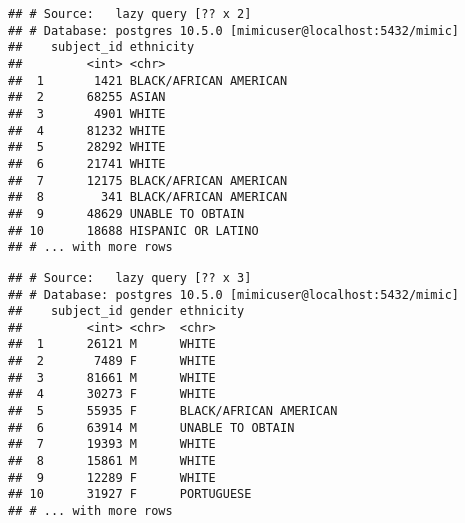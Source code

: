 \documentclass[]{article}
\newenvironment{Shaded}{\begin{snugshade}}{\end{snugshade}}
\newcommand{\KeywordTok}[1]{\textcolor[rgb]{0.13,0.29,0.53}{\textbf{#1}}}
\newcommand{\DataTypeTok}[1]{\textcolor[rgb]{0.13,0.29,0.53}{#1}}
\newcommand{\StringTok}[1]{\textcolor[rgb]{0.31,0.60,0.02}{#1}}
\newcommand{\OperatorTok}[1]{\textcolor[rgb]{0.81,0.36,0.00}{\textbf{#1}}}
\newcommand{\NormalTok}[1]{#1}
\begin{document}
\begin{Shaded}
\end{Shaded}

\begin{verbatim}
## # Source:   lazy query [?? x 2]
## # Database: postgres 10.5.0 [mimicuser@localhost:5432/mimic]
##    subject_id ethnicity             
##         <int> <chr>                 
##  1       1421 BLACK/AFRICAN AMERICAN
##  2      68255 ASIAN                 
##  3       4901 WHITE                 
##  4      81232 WHITE                 
##  5      28292 WHITE                 
##  6      21741 WHITE                 
##  7      12175 BLACK/AFRICAN AMERICAN
##  8        341 BLACK/AFRICAN AMERICAN
##  9      48629 UNABLE TO OBTAIN      
## 10      18688 HISPANIC OR LATINO    
## # ... with more rows
\end{verbatim}

\begin{Shaded}
\end{Shaded}

\begin{verbatim}
## # Source:   lazy query [?? x 3]
## # Database: postgres 10.5.0 [mimicuser@localhost:5432/mimic]
##    subject_id gender ethnicity             
##         <int> <chr>  <chr>                 
##  1      26121 M      WHITE                 
##  2       7489 F      WHITE                 
##  3      81661 M      WHITE                 
##  4      30273 F      WHITE                 
##  5      55935 F      BLACK/AFRICAN AMERICAN
##  6      63914 M      UNABLE TO OBTAIN      
##  7      19393 M      WHITE                 
##  8      15861 M      WHITE                 
##  9      12289 F      WHITE                 
## 10      31927 F      PORTUGUESE            
## # ... with more rows
\end{verbatim}
\end{document}

